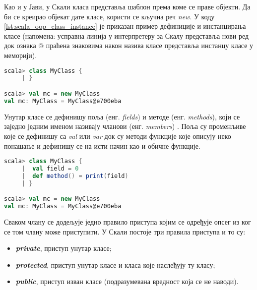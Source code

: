 \documentclass[12pt,oneside]{memoir}
\begin{document}
Као и у Јави, у Скали класа представља шаблон према коме се праве објекти. Да би се креирао објекат дате класе, користи се кључна реч \textit{new}. У коду \ref{lst:scala_oop_class_instance} је приказан  пример дефиниције и инстанцирања класе (напомена: усправна линија у интерпретеру за Скалу представља нови ред док ознака $@$ праћена знаковима након назива класе представља инстанцу класе у меморији).

\begin{lstlisting}[language=Scala, caption={Дефиниција и инстанцирање класе у Скали}, label={lst:scala_oop_class_instance}, basicstyle=\small]
scala> class MyClass {
     | }

scala> val mc = new MyClass
val mc: MyClass = MyClass@e700eba
\end{lstlisting}

Унутар класе се дефинишу поља (енг. \textit{fields}) и методе (енг. \textit{methods}), који се заједно једним именом називају чланови (енг. \textit{members}) \cite{scala_prog}. Поља су променљиве које се дефинишу са \textit{val} или \textit{var} док су методи функције које описују неко понашање и дефинишу се на исти начин као и обичне функције.

\begin{lstlisting}[language=Scala, caption={Чланови класе}, label={lst:scala_oop_members_class}, basicstyle=\small]
scala> class MyClass {
     |  val field = 0
     |  def method() = print(field)
     | }

scala> val mc = new MyClass
val mc: MyClass = MyClass@e700eba

\end{lstlisting}

%

Сваком члану се додељује једно правило приступа којим се одређује опсег из ког се том члану може приступити. У Скали постоје три правила приступа и то су:

\begin{itemize}
\item \textbf{\textit{private}}, приступ унутар класе;
\item \textbf{\textit{protected}}, приступ унутар класе и класа које наслеђују ту класу;
\item \textbf{\textit{public}}, приступ изван класе (подразумевана вредност која се не наводи).
\end{itemize}

%
%
\end{document}
